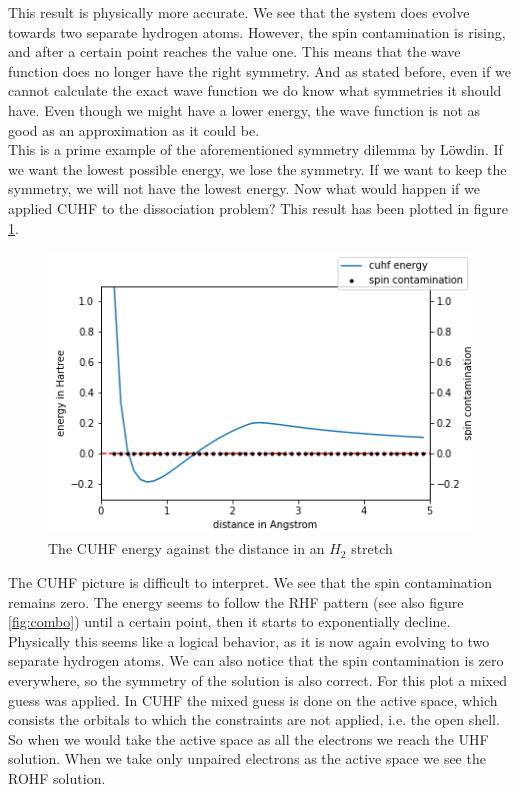 \documentclass[twoside,twocolumn,9pt]{article}
\begin{document}
This result is physically more accurate. We see that the system does evolve towards two separate hydrogen atoms. However, the spin contamination is rising, and after a certain point
reaches the value one. This means that the wave function does no longer have the right symmetry. And as stated before, even if we cannot calculate the exact wave function we do know
what symmetries it should have. Even though we might have a lower energy, the wave function is not as good as an approximation as it could be\cite{Scuseria2013}. \\
This is a prime example of the aforementioned symmetry dilemma by Löwdin. If we want the lowest possible energy, we lose the symmetry. If we want to keep the symmetry, we will not
have the lowest energy. Now what would happen if we applied CUHF to the dissociation problem? This result has been plotted in figure \ref{fig:cuhfstretch}.

\begin{center}
  \begin{figure}[h]
    \includegraphics[width=\linewidth]{./../notes/figures/cuhf_mix.png}
    \caption{The CUHF energy against the distance in an $H_2$ stretch}
    \label{fig:cuhfstretch}
  \end{figure}
\end{center}

The CUHF picture is difficult to interpret. We see that the spin contamination remains zero. The energy seems to follow the RHF pattern (see also figure \ref{fig:combo}) until a
certain point, then it starts to exponentially decline. Physically this seems like a logical behavior, as it is now again evolving to two separate hydrogen atoms. We can also notice
that the spin contamination is zero everywhere, so the symmetry of the solution is also correct. For this plot a mixed guess was applied. In CUHF the mixed guess is done on the
active space, which consists the orbitals to which the constraints are not applied, i.e. the open shell\cite{Scuseria2011}. So when we would take the active space as all the electrons
we reach the UHF solution. When we take only unpaired electrons as the active space we see the ROHF solution.
\end{document}
